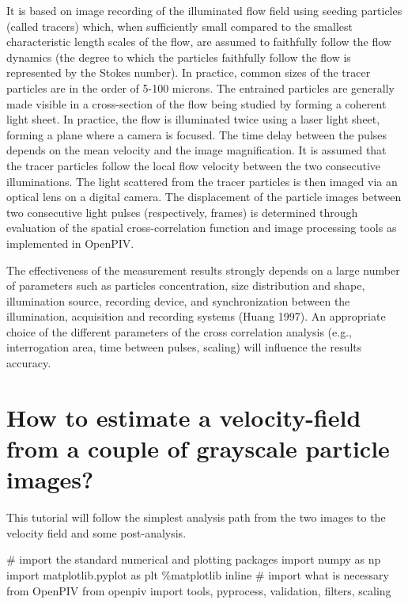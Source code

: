 \documentclass[
  english,
  letterpaper,
  numbers=noendperiod,
  DIV=13]{scrreprt}
\newenvironment{Shaded}{\begin{snugshade}}{\end{snugshade}}
\newcommand{\CommentTok}[1]{\textcolor[rgb]{0.37,0.37,0.37}{#1}}
\newcommand{\ImportTok}[1]{\textcolor[rgb]{0.00,0.46,0.62}{#1}}
\newcommand{\NormalTok}[1]{\textcolor[rgb]{0.00,0.23,0.31}{#1}}
\newcommand{\OperatorTok}[1]{\textcolor[rgb]{0.37,0.37,0.37}{#1}}
\begin{document}
It is based on image recording of the illuminated flow field using
seeding particles (called tracers) which, when sufficiently small
compared to the smallest characteristic length scales of the flow, are
assumed to faithfully follow the flow dynamics (the degree to which the
particles faithfully follow the flow is represented by the Stokes
number). In practice, common sizes of the tracer particles are in the
order of 5-100 microns. The entrained particles are generally made
visible in a cross-section of the flow being studied by forming a
coherent light sheet. In practice, the flow is illuminated twice using a
laser light sheet, forming a plane where a camera is focused. The time
delay between the pulses depends on the mean velocity and the image
magnification. It is assumed that the tracer particles follow the local
flow velocity between the two consecutive illuminations. The light
scattered from the tracer particles is then imaged via an optical lens
on a digital camera. The displacement of the particle images between two
consecutive light pulses (respectively, frames) is determined through
evaluation of the spatial cross-correlation function and image
processing tools as implemented in OpenPIV.

The effectiveness of the measurement results strongly depends on a large
number of parameters such as particles concentration, size distribution
and shape, illumination source, recording device, and synchronization
between the illumination, acquisition and recording systems (Huang
1997). An appropriate choice of the different parameters of the cross
correlation analysis (e.g., interrogation area, time between pulses,
scaling) will influence the results accuracy.

\section{How to estimate a velocity-field from a couple of grayscale
particle
images?}\label{how-to-estimate-a-velocity-field-from-a-couple-of-grayscale-particle-images}

This tutorial will follow the simplest analysis path from the two images
to the velocity field and some post-analysis.

\begin{Shaded}
\begin{Highlighting}[]
\CommentTok{\# import the standard numerical and plotting packages}
\ImportTok{import}\NormalTok{ numpy }\ImportTok{as}\NormalTok{ np}
\ImportTok{import}\NormalTok{ matplotlib.pyplot }\ImportTok{as}\NormalTok{ plt}
\OperatorTok{\%}\NormalTok{matplotlib inline}
\CommentTok{\# import what is necessary from OpenPIV}
\ImportTok{from}\NormalTok{ openpiv }\ImportTok{import}\NormalTok{ tools, pyprocess, validation, filters, scaling}
\end{Highlighting}
\end{Shaded}
\end{document}
